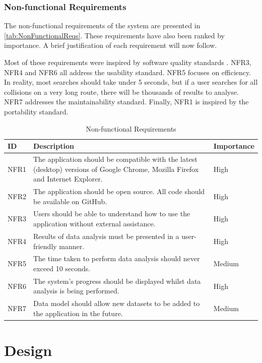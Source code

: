 \documentclass[authoryearcitations]{UoYCSproject}
\begin{document}
\subsection{Non-functional Requirements}

The non-functional requirements of the system are presented in \autoref{tab:NonFunctionalReqs}. These requirements have also been ranked by importance. A brief justification of each requirement will now follow. 

Most of these requirements were inspired by software quality standards \citep{ISO9126}. NFR3, NFR4 and NFR6 all address the usability standard. NFR5 focuses on efficiency. In reality, most searches should take under 5 seconds, but if a user searches for all collisions on a very long route, there will be thousands of results to analyse. NFR7 addresses the maintainability standard. Finally, NFR1 is inspired by the portability standard.

\begin{table}[tbp]
\caption{Non-functional Requirements}
\begin{tabular}{| p{1.5cm} | p{7.5cm} | p{2cm} |}
	\hline
	\textbf{ID} & \textbf{Description} & \textbf{Importance} \\ \hline
	NFR1 & The application should be compatible with the latest (desktop) versions of Google Chrome, Mozilla Firefox and Internet Explorer. & High \\ \hline
	NFR2 & The application should be open source. All code should be available on GitHub. & High \\ \hline
	NFR3 & Users should be able to understand how to use the application without external assistance. & High \\ \hline
	NFR4 & Results of data analysis must be presented in a user-friendly manner. & High \\ \hline
	NFR5 & The time taken to perform data analysis should never exceed 10 seconds. & Medium \\ \hline
	NFR6 & The system's progress should be displayed whilst data analysis is being performed. & High \\ \hline
	NFR7 & Data model should allow new datasets to be added to the application in the future. & Medium \\ \hline
\end{tabular}
\label{tab:NonFunctionalReqs}
\end{table}


\chapter{Design}
\end{document}
